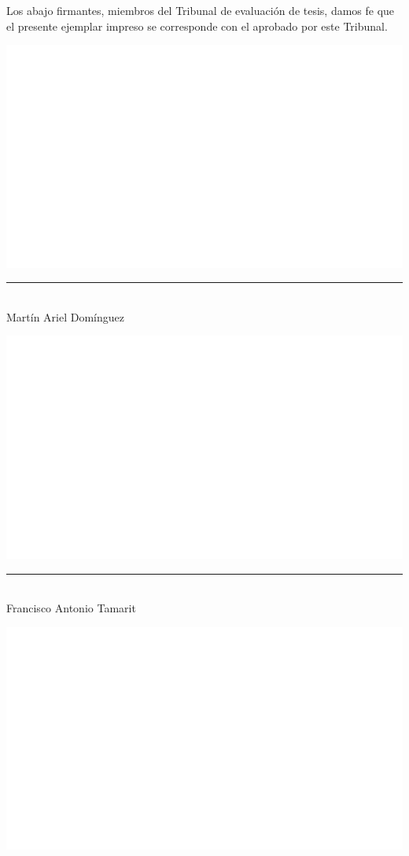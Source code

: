 \documentclass[a4paper,12pt,spanish]{book}
\begin{document}
\thispagestyle{empty}
    \noindent Los abajo firmantes, miembros del Tribunal de evaluación de tesis, damos fe que
    el presente ejemplar impreso se corresponde con el aprobado por este Tribunal.
    \begin{center}
    \begin{minipage}{0.3\textwidth}
        \centering
        \includegraphics[width=\linewidth]{figs/Empty.png}\\
        \rule{0.8\linewidth}{0.4pt}\\
        Martín Ariel Domínguez
    \end{minipage}
    \hfill
    \begin{minipage}{0.3\textwidth}
        \centering
        \includegraphics[width=\linewidth]{figs/Empty.png}\\
        \rule{0.8\linewidth}{0.4pt}\\
        Francisco Antonio Tamarit
    \end{minipage}
    \hfill
    \begin{minipage}{0.3\textwidth}
        \centering
        \includegraphics[width=\linewidth]{figs/Empty.png}\\

\end{minipage}
\end{center}
\end{document}
